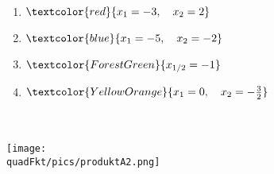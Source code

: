 \begin{Answer}[ref=produktformNullstellenA2]\\
	\begin{minipage}{\textwidth}
		\begin{minipage}{0.49\textwidth}
			\begin{enumerate}[label=\alph*)]
				\item \(\textcolor{red}{x_1=-3,\quad x_2=2}\)
				\item \(\textcolor{blue}{x_1=-5,\quad x_2=-2}\)
			\end{enumerate}
		\end{minipage}
		\begin{minipage}{0.49\textwidth}
			\begin{enumerate}[label=\alph*)]
				\setcounter{enumi}{2}
				\item \(\textcolor{ForestGreen}{x_{1/2}=-1}\)
				\item \(\textcolor{YellowOrange}{x_1=0,\quad x_2=-\frac{3}{2}}\)
			\end{enumerate}
		\end{minipage}
	\end{minipage}\\ \ \\
	\texttt{[image: \\quadFkt/pics/produktA2.png]}
\end{Answer}